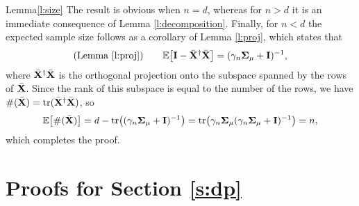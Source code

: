 \begin{proofof}{Lemma}{\ref{l:size}}
  The result is obvious when $n=d$, whereas
  for $n>d$ it is an immediate consequence
  of Lemma \ref{l:decomposition}.
  Finally, for $n<d$ the expected sample
  size follows as a corollary of Lemma \ref{l:proj}, which states that
  \begin{align*}
\text{(Lemma \ref{l:proj})} \qquad\mathbb E\big[\mathbf I - {\bar{\mathbf X}}^\dagger{\bar{\mathbf X}}\big] =
    (\gamma_n\mathbf{\Sigma}_\mu + \mathbf I)^{-1},
  \end{align*}
  where ${\bar{\mathbf X}}^\dagger{\bar{\mathbf X}}$ is the orthogonal projection onto
  the subspace spanned by the rows of ${\bar{\mathbf X}}$. Since the rank of this
  subspace is equal to the number of the rows, we have
  $\#({\bar{\mathbf X}})=\mathrm{tr}({\bar{\mathbf X}}^\dagger{\bar{\mathbf X}})$, so
  \begin{align*}
    \mathbb E\big[\#({\bar{\mathbf X}})\big] = d - \mathrm{tr}\big((\gamma_n\mathbf{\Sigma}_\mu +
    \mathbf I)^{-1}\big) =
    \mathrm{tr}\big(\gamma_n\mathbf{\Sigma}_\mu(\gamma_n\mathbf{\Sigma}_\mu+\mathbf I)^{-1}\big) = n,
  \end{align*}
  which completes the proof.
\end{proofof}

\section{Proofs for Section \ref{s:dp}}
\label{a:dp}

